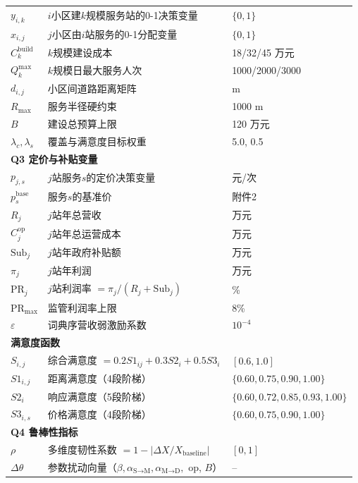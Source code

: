 \begin{table}[htbp]
\begin{tabular}{lll}
\midrule
$y_{i,k}$ & $i$小区建$k$规模服务站的0-1决策变量 & $\{0,1\}$ \\
$x_{i,j}$ & $j$小区由$i$站服务的0-1分配变量 & $\{0,1\}$ \\
$C_k^{\text{build}}$ & $k$规模建设成本 & 18/32/45 万元 \\
$Q_k^{\max}$ & $k$规模日最大服务人次 & 1000/2000/3000 \\
$d_{i,j}$ & 小区间道路距离矩阵 & m \\
$R_{\max}$ & 服务半径硬约束 & 1000 m \\
$B$ & 建设总预算上限 & 120 万元 \\
$\lambda_c,\lambda_s$ & 覆盖与满意度目标权重 & 5.0, 0.5 \\
\midrule
\multicolumn{3}{l}{\textbf{Q3 定价与补贴变量}}\\
\midrule
$p_{j,s}$ & $j$站服务$s$的定价决策变量 & 元/次 \\
$p_s^{\text{base}}$ & 服务$s$的基准价 & 附件2 \\
$R_j$ & $j$站年总营收 & 万元 \\
$C_j^{\text{op}}$ & $j$站年总运营成本 & 万元 \\
$\text{Sub}_j$ & $j$站年政府补贴额 & 万元 \\
$\pi_j$ & $j$站年利润 & 万元 \\
$\text{PR}_j$ & $j$站利润率 $=\pi_j/(R_j+\text{Sub}_j)$ & \% \\
$\text{PR}_{\max}$ & 监管利润率上限 & 8\% \\
$\varepsilon$ & 词典序营收弱激励系数 & $10^{-4}$ \\
\midrule
\multicolumn{3}{l}{\textbf{满意度函数}}\\
\midrule
$S_{i,j}$ & 综合满意度 $=0.2S1_{ij}+0.3S2_i+0.5S3_i$ & $[0.6,1.0]$ \\
$S1_{i,j}$ & 距离满意度（4段阶梯） & $\{0.60,0.75,0.90,1.00\}$ \\
$S2_i$ & 响应满意度（5段阶梯） & $\{0.60,0.72,0.85,0.93,1.00\}$ \\
$S3_{i,s}$ & 价格满意度（4段阶梯） & $\{0.60,0.75,0.90,1.00\}$ \\
\midrule
\multicolumn{3}{l}{\textbf{Q4 鲁棒性指标}}\\
\midrule
$\rho$ & 多维度韧性系数 $=1-|\Delta X/X_{\text{baseline}}|$ & $[0,1]$ \\
$\Delta\theta$ & 参数扰动向量（$\beta,\alpha_{\text{S}\to\text{M}},\alpha_{\text{M}\to\text{D}},$ op, $B$） & -- \\
\bottomrule
\end{tabular}
\end{table}


